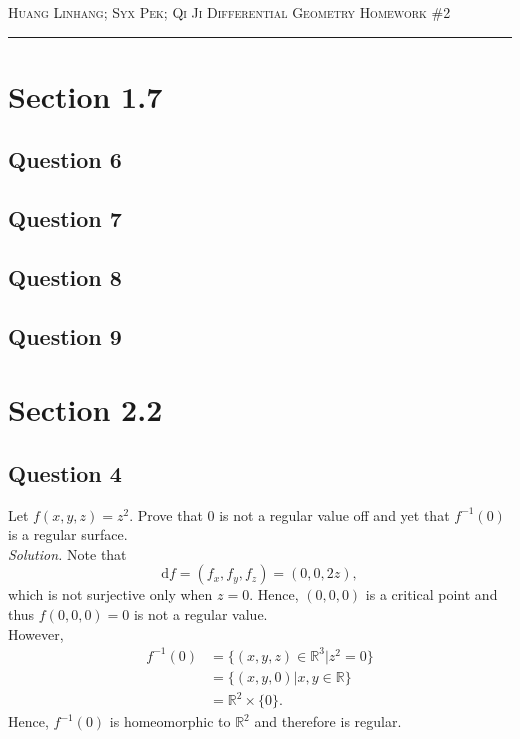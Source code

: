 \documentclass[12pt]{article}
\begin{document}
\thispagestyle{empty}

{\scshape Huang Linhang; Syx Pek; Qi Ji} \hfill {\scshape \large Differential Geometry} \hfill {\scshape Homework \#2}
 
\smallskip
\hrule
\bigskip

\section{Section 1.7}

\subsection*{Question 6}

\subsection*{Question 7}

\subsection*{Question 8}

\subsection*{Question 9}

\section{Section 2.2}

\subsection*{Question 4}
Let $f(x, y, z) = z^2$. Prove that $0$ is not a regular value off and yet that $f^{-1}(0)$ is a regular surface.\\

\textit{Solution.} Note that \begin{equation*}
    \mathrm df = (f_x,f_y,f_z) = (0,0,2z),
\end{equation*}
which is not surjective only when $z=0$. Hence, $(0,0,0)$ is a critical point and thus $f(0,0,0)=0$ is not a regular value.\\

However, \begin{align*}
    f^{-1}(0) &= \{(x,y,z)\in \mathbb{R}^3|z^2 = 0\}\\
    &= \{(x,y,0)|x,y \in \mathbb{R}\} \\
    &= \mathbb{R}^2 \times \{0\}.
\end{align*}
Hence, $f^{-1}(0)$ is homeomorphic to $\mathbb{R}^2$ and therefore is regular.
\end{document}
